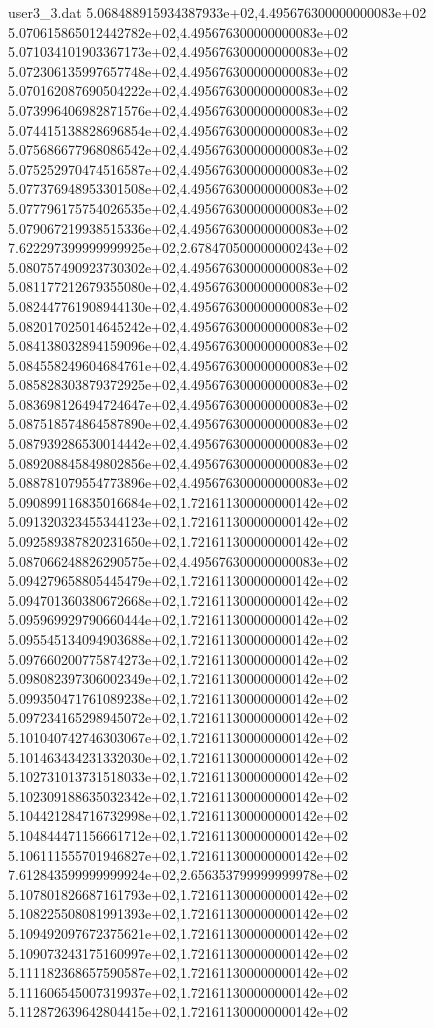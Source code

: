 \begin{filecontents}{user3_3.dat}
5.068488915934387933e+02,4.495676300000000083e+02
5.070615865012442782e+02,4.495676300000000083e+02
5.071034101903367173e+02,4.495676300000000083e+02
5.072306135997657748e+02,4.495676300000000083e+02
5.070162087690504222e+02,4.495676300000000083e+02
5.073996406982871576e+02,4.495676300000000083e+02
5.074415138828696854e+02,4.495676300000000083e+02
5.075686677968086542e+02,4.495676300000000083e+02
5.075252970474516587e+02,4.495676300000000083e+02
5.077376948953301508e+02,4.495676300000000083e+02
5.077796175754026535e+02,4.495676300000000083e+02
5.079067219938515336e+02,4.495676300000000083e+02
7.622297399999999925e+02,2.678470500000000243e+02
5.080757490923730302e+02,4.495676300000000083e+02
5.081177212679355080e+02,4.495676300000000083e+02
5.082447761908944130e+02,4.495676300000000083e+02
5.082017025014645242e+02,4.495676300000000083e+02
5.084138032894159096e+02,4.495676300000000083e+02
5.084558249604684761e+02,4.495676300000000083e+02
5.085828303879372925e+02,4.495676300000000083e+02
5.083698126494724647e+02,4.495676300000000083e+02
5.087518574864587890e+02,4.495676300000000083e+02
5.087939286530014442e+02,4.495676300000000083e+02
5.089208845849802856e+02,4.495676300000000083e+02
5.088781079554773896e+02,4.495676300000000083e+02
5.090899116835016684e+02,1.721611300000000142e+02
5.091320323455344123e+02,1.721611300000000142e+02
5.092589387820231650e+02,1.721611300000000142e+02
5.087066248826290575e+02,4.495676300000000083e+02
5.094279658805445479e+02,1.721611300000000142e+02
5.094701360380672668e+02,1.721611300000000142e+02
5.095969929790660444e+02,1.721611300000000142e+02
5.095545134094903688e+02,1.721611300000000142e+02
5.097660200775874273e+02,1.721611300000000142e+02
5.098082397306002349e+02,1.721611300000000142e+02
5.099350471761089238e+02,1.721611300000000142e+02
5.097234165298945072e+02,1.721611300000000142e+02
5.101040742746303067e+02,1.721611300000000142e+02
5.101463434231332030e+02,1.721611300000000142e+02
5.102731013731518033e+02,1.721611300000000142e+02
5.102309188635032342e+02,1.721611300000000142e+02
5.104421284716732998e+02,1.721611300000000142e+02
5.104844471156661712e+02,1.721611300000000142e+02
5.106111555701946827e+02,1.721611300000000142e+02
7.612843599999999924e+02,2.656353799999999978e+02
5.107801826687161793e+02,1.721611300000000142e+02
5.108225508081991393e+02,1.721611300000000142e+02
5.109492097672375621e+02,1.721611300000000142e+02
5.109073243175160997e+02,1.721611300000000142e+02
5.111182368657590587e+02,1.721611300000000142e+02
5.111606545007319937e+02,1.721611300000000142e+02
5.112872639642804415e+02,1.721611300000000142e+02

\end{filecontents}
